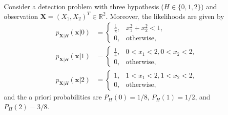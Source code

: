 \question[25] %


Consider a detection problem with three hypothesis ($H \in\{0,1,2\}$) and observation $\mathbf{X} = (X_1, X_2)^T \in \mathbb{R}^2$. Moreover, the likelihoods are given by
\begin{align*}
  p_{\mathbf{X}|H}(\mathbf{x}|0) &= \begin{cases} \frac{1}{\pi}, & x_1^2 + x_2^2 < 1, \\ 0, & \text{otherwise}, \end{cases} \\
  p_{\mathbf{X}|H}(\mathbf{x}|1) &= \begin{cases} \frac{1}{4}, & 0 < x_1 < 2, 0 < x_2 < 2, \\ 0, & \text{otherwise}, \end{cases}\\
  p_{\mathbf{X}|H}(\mathbf{x}|2) &= \begin{cases} 1, & 1 < x_1 < 2, 1 < x_2 < 2, \\ 0, & \text{otherwise}, \end{cases}
\end{align*}
and the a priori probabilities are $P_H(0) = 1/8$, $P_H(1) = 1/2$, and $P_H(2) = 3/8$.

